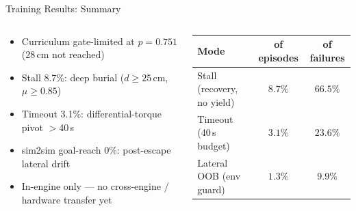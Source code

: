 \documentclass[aspectratio=169, 10pt]{beamer}
\newcommand{\warn}{\textcolor{WarnOrange}{\faExclamationTriangle}\;}
\begin{document}
\begin{frame}{Training Results: Summary}
\begin{columns}[T]
\begin{tcolorbox}[mycard, title={\faExclamationTriangle\; Known Limitations}]
  \tiny
  \begin{itemize}[leftmargin=0.8em, itemsep=2pt]
    \item[\warn] Curriculum gate-limited at $p{=}0.751$ (28\,cm not reached)
    \item[\warn] Stall 8.7\%: deep burial ($d{\geq}25$\,cm, $\mu{\geq}0.85$)
    \item[\warn] Timeout 3.1\%: differential-torque pivot $>$40\,s
    \item[\warn] sim2sim goal-reach 0\%: post-escape lateral drift
    \item[\warn] In-engine only — no cross-engine / hardware transfer yet
  \end{itemize}
\end{tcolorbox}

\vspace{0.2em}
\begin{tcolorbox}[mycard, title={\faTable\; Failure-Mode Taxonomy (13.1\% non-escape)}]
  {\tiny\setlength{\tabcolsep}{3pt}
  \begin{tabular}{@{}lcc@{}}
    \toprule
    \rowcolor{MarsRust!8}
    \color{StarWhite}\textbf{Mode} & \color{StarWhite}\textbf{of episodes} & \color{StarWhite}\textbf{of failures} \\
    \midrule
    \rowcolor{CardBg} Stall (recovery, no yield) & $8.7\%$ & $66.5\%$ \\
    \rowcolor{SlideGray} Timeout (40\,s budget)     & $3.1\%$ & $23.6\%$ \\
    \rowcolor{CardBg} Lateral OOB (env guard)    & $1.3\%$ & $9.9\%$ \\
    \bottomrule
  \end{tabular}
  }
\end{tcolorbox}

\end{columns}
\end{frame}
\end{document}
